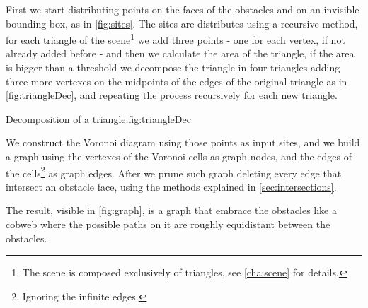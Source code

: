 \documentclass[dissertation.tex]{subfiles}
\begin{document}
First we
start distributing points on the faces of the obstacles and on
an invisible bounding box, as in \cref{fig:sites}.
The sites are distributes using a recursive method, for each triangle
of the scene\footnote{The scene is composed exclusively of triangles,
  see \cref{cha:scene} for details.} we add three points - one for each
vertex, if not already added before - and then we calculate the area
of the triangle, if the area is bigger than a threshold we decompose
the triangle in four triangles adding three more vertexes on the
midpoints of the edges of the original triangle as in
\cref{fig:triangleDec}, and repeating the process recursively for
each new triangle.
\begin{myfig}{Decomposition of a triangle.}{fig:triangleDec}
\end{myfig}

We construct the Voronoi diagram using
those points as input sites, and we build a graph using the vertexes
of the Voronoi cells as graph nodes, and the edges of the cells\footnote{Ignoring the
  infinite edges.} as graph edges. After we prune such graph deleting every edge that
intersect an obstacle face, using the methods explained in \cref{sec:intersections}.

The result, visible in \cref{fig:graph}, is a graph that embrace the
obstacles like a cobweb where the possible paths on it are roughly
equidistant between the obstacles.
\end{document}
